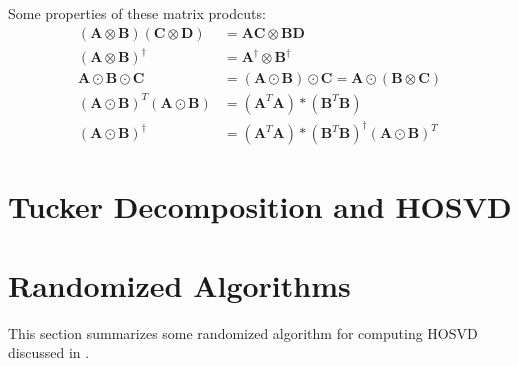 \documentclass[final]{elsarticle}
\begin{document}
Some properties of these matrix prodcuts:
\begin{subequations}
    \begin{align}
        (\mathbf{A}\otimes\mathbf{B})(\mathbf{C}\otimes\mathbf{D}) &= \mathbf{A}\mathbf{C}\otimes\mathbf{B}\mathbf{D} \\
        (\mathbf{A}\otimes\mathbf{B})^{\dagger} &= \mathbf{A}^{\dagger}\otimes\mathbf{B}^{\dagger} \\
        \mathbf{A}\odot\mathbf{B}\odot\mathbf{C} &= (\mathbf{A}\odot\mathbf{B})\odot\mathbf{C} = \mathbf{A}\odot(\mathbf{B}\otimes\mathbf{C}) \\
        (\mathbf{A}\odot\mathbf{B})^T(\mathbf{A}\odot\mathbf{B}) &= (\mathbf{A}^T\mathbf{A})*(\mathbf{B}^T\mathbf{B}) \\
        (\mathbf{A}\odot\mathbf{B})^{\dagger} &= (\mathbf{A}^T\mathbf{A})*(\mathbf{B}^T\mathbf{B})^{\dagger}(\mathbf{A}\odot\mathbf{B})^T
    \end{align}
\end{subequations}
\section{Tucker Decomposition and HOSVD}
\section{Randomized Algorithms}
\noindent This section summarizes some randomized algorithm for computing HOSVD discussed in \cite{9350569}.


\end{document}
